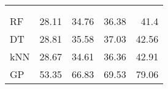 \begin{margintable}
	\vspace{-0.2cm}
	\centering
	\begin{tabularx}{1\marginparwidth}{Xd{2.1}d{2.1}d{1.1}d{1.1}}
		\toprule
		&
		&    
		 &
		 &
		 \\
		\\
		\midrule
		RF & 28.11    & 34.76                     &36.38 & 41.4 \\ 
		DT                  & 28.81 					   & 35.58                     &37.03                     & 42.56 \\ 
		kNN                 & 28.67 					   & 34.61 &36.36                     & 42.91 \\ 
		GP                  & 53.35 					   & 66.83                     &69.53                     & 79.06 \\ \midrule
		

\end{tabularx}
\end{margintable}
